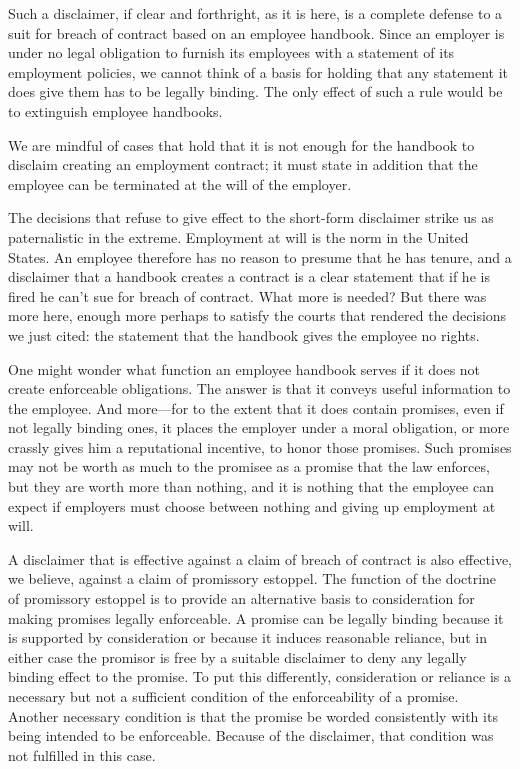 \documentclass[
  letterpaper,
  11pt,
  DIV=9,
  openright]{scrbook}
\begin{document}
Such a disclaimer, if clear and forthright, as it is here, is a complete
defense to a suit for breach of contract based on an employee handbook.
Since an employer is under no legal obligation to furnish its employees
with a statement of its employment policies, we cannot think of a basis
for holding that any statement it does give them has to be legally
binding. The only effect of such a rule would be to extinguish employee
handbooks.

We are mindful of cases that hold that it is not enough for the handbook
to disclaim creating an employment contract; it must state in addition
that the employee can be terminated at the will of the employer.

The decisions that refuse to give effect to the short-form disclaimer
strike us as paternalistic in the extreme. Employment at will is the
norm in the United States. An employee therefore has no reason to
presume that he has tenure, and a disclaimer that a handbook creates a
contract is a clear statement that if he is fired he can't sue for
breach of contract. What more is needed? But there was more here, enough
more perhaps to satisfy the courts that rendered the decisions we just
cited: the statement that the handbook gives the employee no rights.

One might wonder what function an employee handbook serves if it does
not create enforceable obligations. The answer is that it conveys useful
information to the employee. And more---for to the extent that it does
contain promises, even if not legally binding ones, it places the
employer under a moral obligation, or more crassly gives him a
reputational incentive, to honor those promises. Such promises may not
be worth as much to the promisee as a promise that the law enforces, but
they are worth more than nothing, and it is nothing that the employee
can expect if employers must choose between nothing and giving up
employment at will.

A disclaimer that is effective against a claim of breach of contract is
also effective, we believe, against a claim of promissory estoppel. The
function of the doctrine of promissory estoppel is to provide an
alternative basis to consideration for making promises legally
enforceable. A promise can be legally binding because it is supported by
consideration or because it induces reasonable reliance, but in either
case the promisor is free by a suitable disclaimer to deny any legally
binding effect to the promise. To put this differently, consideration or
reliance is a necessary but not a sufficient condition of the
enforceability of a promise. Another necessary condition is that the
promise be worded consistently with its being intended to be
enforceable. Because of the disclaimer, that condition was not fulfilled
in this case.
\end{document}
